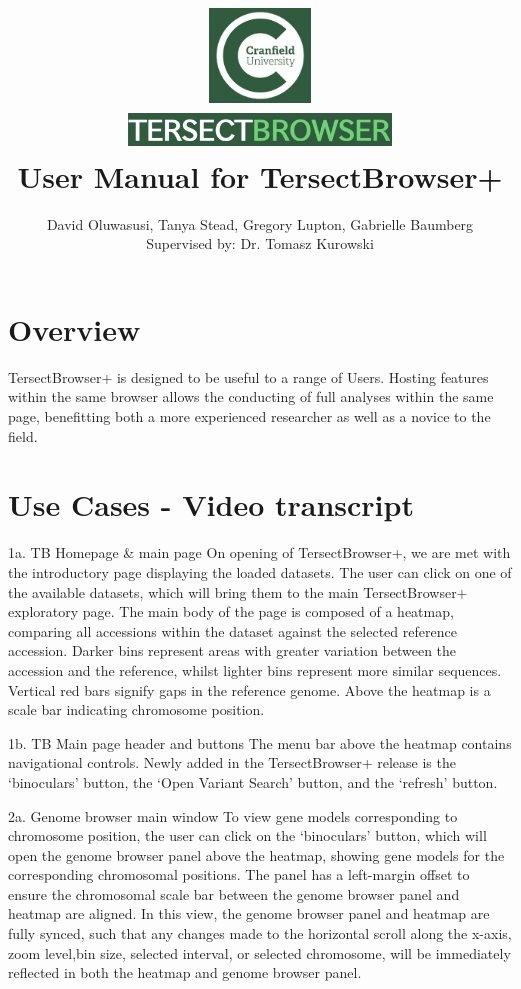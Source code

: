 \documentclass[12pt]{article}
\title{
{\includegraphics[width=3cm, height=2.5cm]{Cran.jpg}}
\\
\includegraphics[width=7cm, height=1cm]{TB.jpg}
\\
{User Manual for TersectBrowser+}
}
\author{David Oluwasusi, Tanya Stead, Gregory Lupton, Gabrielle Baumberg \\ Supervised by: Dr. Tomasz Kurowski}
\begin{document}
\sloppy %

\maketitle

\section{Overview}
TersectBrowser+ is designed to be useful to a range of Users. Hosting features within the same browser allows the conducting of full analyses within the same page, benefitting both a more experienced researcher as well as a novice to the field. 

\section{Use Cases - Video transcript}
1a. TB Homepage & main page
On opening of TersectBrowser+, we are met with the introductory page displaying the loaded datasets. The user can click on one of the available datasets, which will bring them to the main TersectBrowser+ exploratory page. The main body of the page is composed of a heatmap, comparing all accessions within the dataset against the selected reference accession. Darker bins represent areas with greater variation between the accession and the reference, whilst lighter bins represent more similar sequences. Vertical red bars signify gaps in the reference genome. Above the heatmap is a scale bar indicating chromosome position. 

1b. TB Main page header and buttons
The menu bar above the heatmap contains navigational controls. Newly added in the TersectBrowser+ release is the `binoculars' button, the `Open Variant Search' button, and the `refresh' button.

2a. Genome browser main window
To view gene models corresponding to chromosome position, the user can click on the `binoculars' button, which will open the genome browser panel above the heatmap, showing gene models for the corresponding chromosomal positions. The panel has a left-margin offset to ensure the chromosomal scale bar between the genome browser panel and heatmap are aligned. In this view, the genome browser panel and heatmap are fully synced, such that any changes made to the horizontal scroll along the x-axis, zoom level,bin size, selected interval, or selected chromosome, will be immediately reflected in both the heatmap and genome browser panel. 
\end{document}
